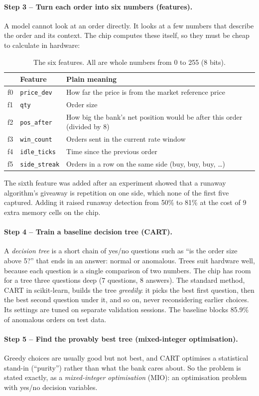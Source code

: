 \documentclass[11pt,a4paper]{article}
\newcommand{\code}[1]{\texttt{#1}}
\newcommand{\step}[2]{\paragraph{Step #1 -- #2.}}
\begin{document}
\step{3}{Turn each order into six numbers (features)}
A model cannot look at an order directly. It looks at a few numbers that describe the order
and its context. The chip computes these itself, so they must be cheap to calculate in hardware:

\begin{table}[H]
\centering\small
\begin{tabularx}{\linewidth}{@{}clX@{}}
\toprule
& Feature & Plain meaning \\
\midrule
f0 & \code{price\_dev}   & How far the price is from the market reference price \\
f1 & \code{qty}          & Order size \\
f2 & \code{pos\_after}   & How big the bank's net position would be after this order (divided by 8) \\
f3 & \code{win\_count}   & Orders sent in the current rate window \\
f4 & \code{idle\_ticks}  & Time since the previous order \\
f5 & \code{side\_streak} & Orders in a row on the same side (buy, buy, buy, \ldots) \\
\bottomrule
\end{tabularx}
\caption{The six features. All are whole numbers from 0 to 255 (8 bits).}
\end{table}

The sixth feature was added after an experiment showed that a runaway algorithm's giveaway is
repetition on one side, which none of the first five captured. Adding it raised runaway detection
from 50\% to 81\% at the cost of 9 extra memory cells on the chip.

\step{4}{Train a baseline decision tree (CART)}
A \emph{decision tree} is a short chain of yes/no questions such as ``is the order size above 5?''
that ends in an answer: normal or anomalous. Trees suit hardware well, because each question is
a single comparison of two numbers. The chip has room for a tree three questions deep (7 questions,
8 answers). The standard method, CART in scikit-learn, builds the tree \emph{greedily}: it picks the
best first question, then the best second question under it, and so on, never reconsidering earlier
choices. Its settings are tuned on separate validation sessions. The baseline blocks 85.9\% of
anomalous orders on test data.

\step{5}{Find the provably best tree (mixed-integer optimisation)}
Greedy choices are usually good but not best, and CART optimises a statistical stand-in
(``purity'') rather than what the bank cares about. So the problem is stated exactly, as a
\emph{mixed-integer optimisation} (MIO): an optimisation problem with yes/no decision variables.
\end{document}
